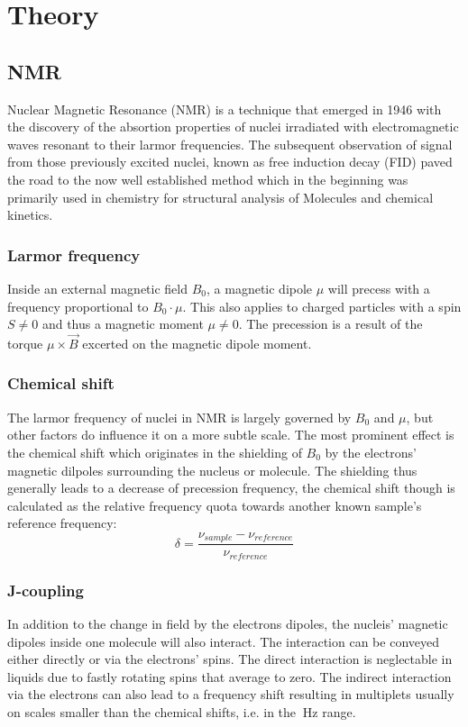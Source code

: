 \chapter{Theory}\label{chap:theory}
    \section{NMR}
        Nuclear Magnetic Resonance (NMR) is a technique that emerged in 1946 with the discovery
        of the absortion properties of nuclei irradiated with electromagnetic waves resonant to their
        larmor frequencies.\cite{ResonanceAbsorption} The subsequent observation of signal from those
        previously excited nuclei, known as free induction decay (FID) paved the road to the now well
        established method which in the beginning was primarily used in chemistry for structural
        analysis of Molecules and chemical kinetics.
        \subsection{Larmor frequency}
            Inside an external magnetic field $B_0$, a magnetic dipole $\mu$ will precess with a frequency
            proportional to $B_0\cdot \mu$. This also applies to charged particles with a spin $S\neq0$ and thus
            a magnetic moment $\mu\neq0$. The precession is a result of the torque $\mu\times\vec B$
            excerted on the magnetic dipole moment.
        \subsection{Chemical shift}
            The larmor frequency of nuclei in NMR is largely governed by $B_0$ and $\mu$, but other factors do
            influence it on a more subtle scale. The most prominent effect is the chemical shift which
            originates in the shielding of $B_0$ by the electrons' magnetic dilpoles surrounding the nucleus or molecule.
            The shielding thus generally leads to a decrease of precession frequency, the chemical shift
            though is calculated as the relative frequency quota towards another known sample's
            reference frequency:
            \begin{equation}
                \delta = \frac{\nu_{sample} - \nu_{reference}}{\nu_{reference}}
            \end{equation}
        \subsection{J-coupling}
            In addition to the change in field by the electrons dipoles, the nucleis' magnetic
            dipoles inside one molecule will also interact. The interaction can be conveyed either
            directly or via the electrons' spins. The direct interaction is neglectable in liquids
            due to fastly rotating spins that average to zero. The indirect interaction via the
            electrons can also lead to a frequency shift resulting in multiplets usually on scales
            smaller than the chemical shifts, i.e. in the $\SI{}{\hertz}$ range.
